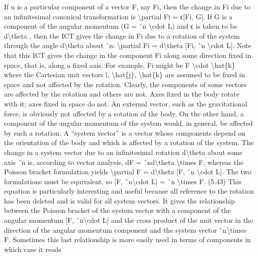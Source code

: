 If u is a particular component of a vector F, say Fi, then the change in Fi
due to an infinitesimal canonical transformation is
\textbackslash{}partial Fi = ϵ[Fi, G].
If G is a component of the angular momentum (G = ˆn \textbackslash{}cdot  L) and ϵ is taken to be
d\textbackslash{}theta , then the ICT gives the change in Fi due to a rotation of the system through
the angle d\textbackslash{}theta  about ˆn:
\textbackslash{}partial Fi = d\textbackslash{}theta [Fi, ˆn \textbackslash{}cdot  L].
Note that this ICT gives the change in the component Fi along some direction fixed in space, that is, along a fixed axis. For example, Fi might be F \textbackslash{}cdot  \textbackslash{}hat\{k\}
where the Cartesian unit vectors î, \textbackslash{}hat\{j\}, \textbackslash{}hat\{k\} are assumed to be fixed in space and not
affected by the rotation. Clearly, the components of some vectors are affected
by the rotation and others are not. Axes fixed in the body rotate with it; axes
fixed in space do not. An external vector, such as the gravitational force, is
obviously not affected by a rotation of the body. On the other hand, a component of the angular momentum of the system would, in general, be affected by
such a rotation. A ``system vector'' is a vector whose components depend on
the orientation of the body and which is affected by a rotation of the system.
The change in a system vector due to an infinitesimal rotation d\textbackslash{}theta  about some
axis ˆn is, according to vector analysis,
dF = ˆnd\textbackslash{}theta \textbackslash{}times F,
whereas the Poisson bracket formulation yields
\textbackslash{}partial F = d\textbackslash{}theta [F, ˆn \textbackslash{}cdot  L].
The two formulations must be equivalent, so
[F, ˆn\textbackslash{}cdot L] = ˆn \textbackslash{}times  F.
(5.43)
This equation is particularly interesting and useful because all reference to the
rotation has been deleted and is valid for all system vectors. It gives the relationship between the Poisson bracket of the system vector with a component of
the angular momentum [F, ˆn\textbackslash{}cdot L] and the cross product of the unit vector in the
direction of the angular momentum component and the system vector ˆn\textbackslash{}times F.
Sometimes this last relationship is more easily used in terms of components in
which case it reads

